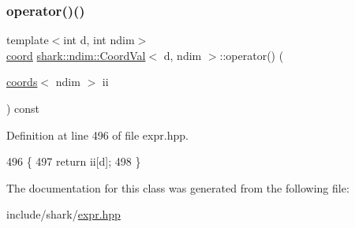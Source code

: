 \subsubsection{\texorpdfstring{operator()()}{operator()()}}
{\footnotesize\ttfamily template$<$int d, int ndim$>$ \\
\hyperlink{namespaceshark_a767a92d5dd82cb82266473bff42fa6d9}{coord} \hyperlink{classshark_1_1ndim_1_1_coord_val}{shark\+::ndim\+::\+Coord\+Val}$<$ d, ndim $>$\+::operator() (\begin{DoxyParamCaption}\item[{\hyperlink{structshark_1_1ndim_1_1coords}{coords}$<$ ndim $>$}]{ii }\end{DoxyParamCaption}) const\hspace{0.3cm}{\ttfamily [inline]}}



Definition at line 496 of file expr.\+hpp.


\begin{DoxyCode}
496                                                                        \{
497             \textcolor{keywordflow}{return} ii[d];
498         \}
\end{DoxyCode}


The documentation for this class was generated from the following file\+:\begin{DoxyCompactItemize}
\item 
include/shark/\hyperlink{expr_8hpp}{expr.\+hpp}\end{DoxyCompactItemize}
